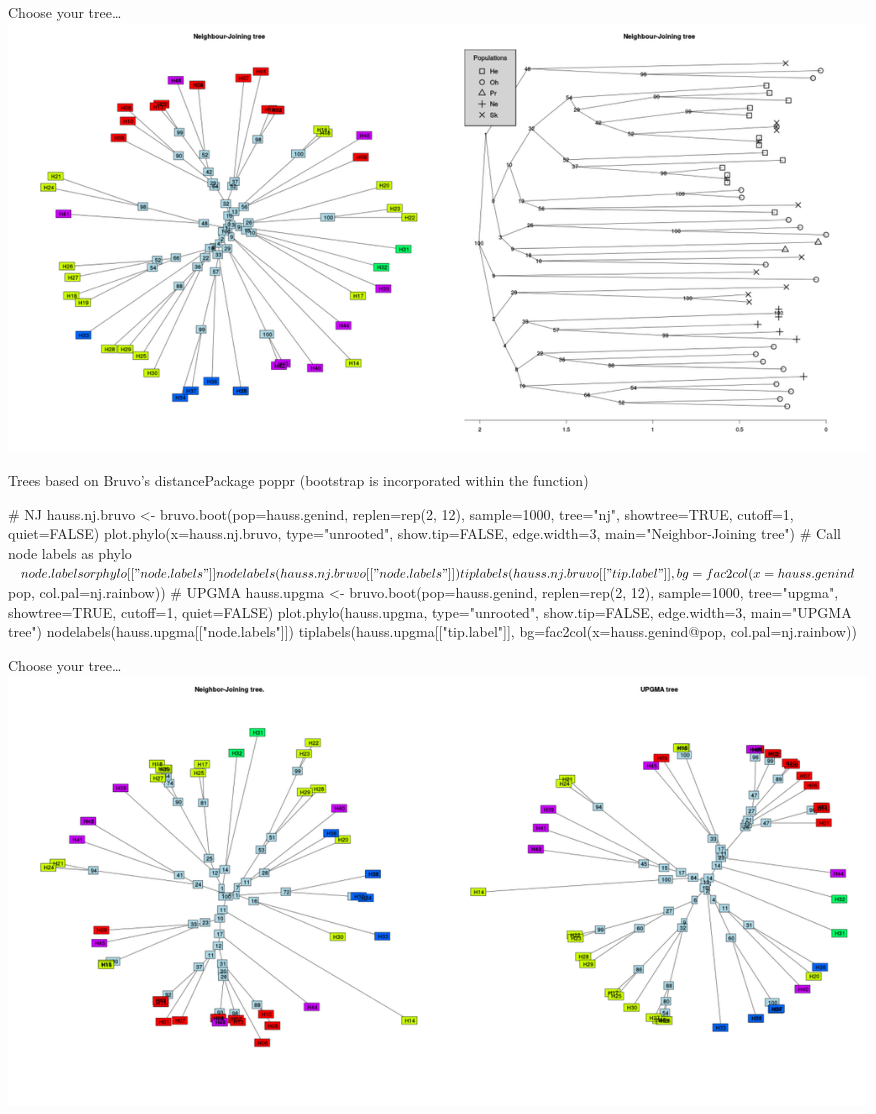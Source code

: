 \documentclass[compress, ucs, xelatex, 11pt, xcolor=svgnames,
	hyperref={
		bookmarks=true,
		unicode=true,
		colorlinks=true,
		pdftitle={Molecular data in R},
		plainpages=false,
		pdfauthor={Vojtech Zeisek},
		pdfsubject={Course about phylogeny and evolution in R},
		pdfcreator={XeLaTeX},
		pdfkeywords={R, evolution, phylogeny, molecular data},
		linkcolor=Tomato,
		anchorcolor=SaddleBrown,
		citecolor=Goldenrod,
		filecolor=DarkMagenta,
		menucolor=Sienna,
		urlcolor=DarkTurquoise,
		pdftex},
	url={hyphens, lowtilde} %
	]{beamer}
\begin{document}
\begin{frame}{Choose your tree\ldots}
	\includegraphics[width=\textwidth]{nj2.png}
\end{frame}

\begin{frame}[fragile]{Trees based on Bruvo's distance}{Package poppr (bootstrap is incorporated within the function)}
	\begin{spluscode}
    # NJ
    hauss.nj.bruvo <- bruvo.boot(pop=hauss.genind, replen=rep(2, 12),
      sample=1000, tree="nj", showtree=TRUE, cutoff=1, quiet=FALSE)
    plot.phylo(x=hauss.nj.bruvo, type="unrooted", show.tip=FALSE,
      edge.width=3, main="Neighbor-Joining tree")
    # Call node labels as phylo$node.labels or phylo[["node.labels"]]
    nodelabels(hauss.nj.bruvo[["node.labels"]])
    tiplabels(hauss.nj.bruvo[["tip.label"]], bg=fac2col(x=hauss.genind$pop,
      col.pal=nj.rainbow))
    # UPGMA
    hauss.upgma <- bruvo.boot(pop=hauss.genind, replen=rep(2, 12),
      sample=1000, tree="upgma", showtree=TRUE, cutoff=1, quiet=FALSE)
    plot.phylo(hauss.upgma, type="unrooted", show.tip=FALSE, edge.width=3,
      main="UPGMA tree")
    nodelabels(hauss.upgma[["node.labels"]])
    tiplabels(hauss.upgma[["tip.label"]], bg=fac2col(x=hauss.genind@pop,
      col.pal=nj.rainbow))
	\end{spluscode}
\end{frame}

\begin{frame}{Choose your tree\ldots}
	\includegraphics[width=\textwidth]{nj-upgma-bruvo.png}
\end{frame}
\end{document}

